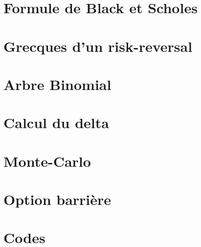 \documentclass[12pt,oneside,a4paper]{article}
\begin{document}


{\hypersetup{linkcolor=black}
\tableofcontents}
\newpage
{\hypersetup{linkcolor=black}
\listoffigures}
\newpage
\renewcommand\listoflistingscaption{Codes}
{\hypersetup{linkcolor=black}\listoflistings}
\newpage

\section{Formule de Black et Scholes} %
\label{sec:question_1}



\newpage

\section{Grecques d'un risk-reversal} %
\label{sec:question_2}




\newpage

\section{Arbre Binomial} %
\label{sec:question_3}





\newpage

\section{Calcul du delta} %
\label{sec:calcul_du_delta}




\newpage

\section{Monte-Carlo} %
\label{sec:question_5}



\newpage

\section{Option barrière} %



\newpage

\section{Codes} %
\label{sec:codes}


\end{document}
